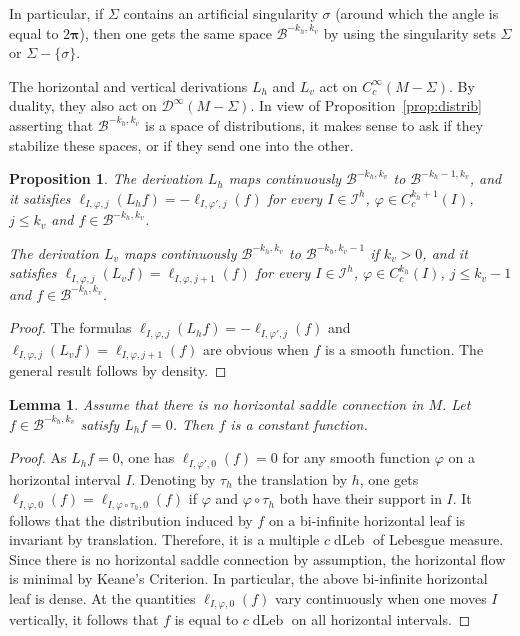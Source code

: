 \documentclass[JEP,XML,SOM,Unicode]{cedram}
\newcommand{\boI}{\mathcal{I}}
\newcommand{\boB}{\mathcal{B}}
\newcommand{\boD}{\mathcal{D}}
\newcommand{\bpi}{\boldsymbol{\pi}}
\DeclareMathOperator{\dLeb}{dLeb}
\let\phi\varphi
\newtheorem{prop}[thm]{Proposition}
\newtheorem{lem}[thm]{Lemma}
\theoremstyle{definition}
\numberwithin{equation}{section}
\begin{document}
In particular, if $\Sigma$ contains an artificial singularity $\sigma$ (\ie around which the angle is equal to $2\bpi$), then one gets the same space
$\boB^{-k_h, k_v}$ by using the singularity sets $\Sigma$ or $\Sigma
-\{\sigma\}$.

The horizontal and vertical derivations $L_h$ and $L_v$ act on
$C^\infty_c(M-\Sigma)$. By duality, they also act on $\boD^\infty(M-\Sigma)$.
In view of Proposition~\ref{prop:distrib} asserting that $\boB^{-k_h, k_v}$ is
a space of distributions, it makes sense to ask if they
stabilize these spaces, or if they send one into the other.

\begin{prop}
\label{prop:Lh_Lv_action} The derivation $L_h$ maps continuously $\boB^{-k_h,
k_v}$ to $\boB^{-k_h-1, k_v}$, and it satisfies $\ell_{I,\phi, j}(L_h f) =
-\ell_{I,\phi', j}(f)$ for every $I \in \boI^h$, $\phi \in C^{k_h+1}_c(I)$,
$j \leq k_v$ and $f \in \boB^{-k_h, k_v}$.

The derivation $L_v$ maps continuously $\boB^{-k_h, k_v}$ to $\boB^{-k_h,
k_v-1}$ if $k_v>0$, and it satisfies $\ell_{I,\phi, j}(L_v f) = \ell_{I,
\phi, j+1}(f)$ for every $I \in \boI^h$, $\phi \in C^{k_h}_c(I)$, $j \leq
k_v-1$ and $f \in \boB^{-k_h, k_v}$.
\end{prop}
\begin{proof}
The formulas $\ell_{I,\phi, j}(L_h f) = -\ell_{I,\phi', j}(f)$ and
$\ell_{I,\phi, j}(L_v f) = \ell_{I, \phi, j+1}(f)$ are obvious when $f$ is a
smooth function. The general result follows by density.
\end{proof}

\begin{lem}
\label{lem:Lh_0} Assume that there is no horizontal saddle connection in $M$.
Let \hbox{$f\in \boB^{-k_h, k_v}$} satisfy $L_h f = 0$. Then $f$ is a constant
function.
\end{lem}
\begin{proof}
As $L_h f = 0$, one has $\ell_{I,\phi', 0}(f) = 0$ for any smooth function
$\phi$ on a horizontal interval $I$. Denoting by $\tau_h$ the translation by
$h$, one gets $\ell_{I,\phi, 0}(f) = \ell_{I,\phi \circ \tau_h, 0}(f)$ if
$\phi$ and $\phi \circ \tau_h$ both have their support in $I$. It follows
that the distribution induced by $f$ on a bi-infinite horizontal leaf is
invariant by translation. Therefore, it is a multiple $c\dLeb$ of Lebesgue
measure. Since there is no horizontal saddle connection by assumption, the
horizontal flow is minimal by Keane's Criterion. In particular, the above
bi-infinite horizontal leaf is dense. At the quantities $\ell_{I,\phi, 0}(f)$
vary continuously when one moves $I$ vertically, it follows that $f$ is equal
to $c\dLeb$ on all horizontal intervals.
\end{proof}
\end{document}
